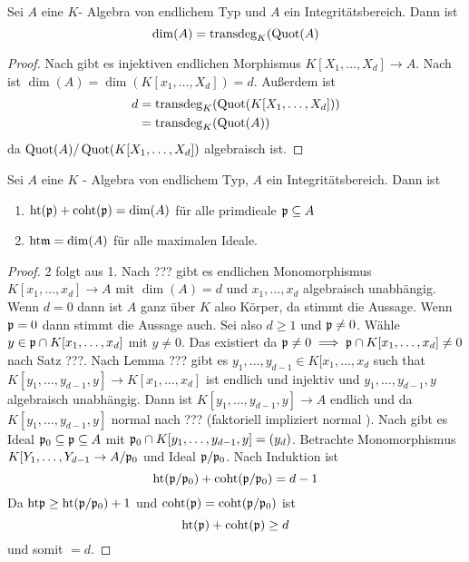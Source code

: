 \begin{Satz} Sei \( A \) eine \( K \)- Algebra von endlichem Typ und \( A \) ein Integritätsbereich. Dann ist 
	\[ \dim(A)=\operatorname{transdeg}_K(\operatorname{Quot}(A) \]
	
\end{Satz}
\begin{proof}
	Nach  gibt es injektiven endlichen Morphismus \( K[X_1,\dots,X_d] \to A\). Nach 
	ist \( \dim(A) = \dim(  K[x_1,\dots,X_d] ) = d \).
	Außerdem ist
	\begin{align*}
		d & = \operatorname{transdeg}_K(\operatorname{Quot}(K[X_1,\dots,X_d]))\\
		&= \operatorname{transdeg}_K(\operatorname{Quot}(A))
	\end{align*} da \( \operatorname{Quot}(A) / \operatorname{Quot}(K[X_1,\dots,X_d])\) algebraisch ist.
\end{proof}
\begin{Satz} Sei \( A \) eine \( K \) - Algebra von endlichem Typ, \(A \) ein Integritätsbereich.
	Dann ist \begin{enumerate}
		\item \( \mathrm{ht}(\mathfrak{p}) + \mathrm{coht}(\mathfrak{p}) = \dim(A) \) für alle primdieale \(\mathfrak{p}\subseteq A \)
		\item \( \mathrm{ht} \mathfrak{m} = \dim (A) \) für alle maximalen Ideale.
	\end{enumerate}
	
\end{Satz}
\begin{proof}
	2 folgt aus 1.
	Nach ??? gibt es endlichen Monomorphismus \( K[x_1,\dots,x_d] \to A \) mit \( \dim(A)=d\) und \( x_1,\dots,x_d\) algebraisch
	unabhängig.
	Wenn \( d=0 \) dann ist \(A\) ganz über \( K \) also Körper, da stimmt die Aussage.
	Wenn \( \mathfrak{p} =0 \) dann stimmt die Aussage auch.
	Sei also \(d\geq 1\) und \( \mathfrak{p}\neq 0 \).
	Wähle \( y \in \mathfrak{p} \cap K[x_1,\dots,x_d] \) mit \( y \neq 0 \). Das existiert da
	\(\mathfrak{p}\neq 0 \implies \mathfrak{p} \cap K[x_1,\dots,x_d]\neq 0 \) nach Satz ???. Nach Lemma ???
	gibt es \( y_1, \dots, y_{d-1} \in K[x_1,\dots, x_d\) such that \( K[y_1,\dots,y_{d-1},y] \to K[x_1,\dots,x_d] \) ist
	endlich und injektiv und \( y_1,\dots,y_{d-1},y \) algebraisch unabhängig. Dann ist \(K[y_1,\dots,y_{d-1},y]\to A\) endlich
	und da \(K[y_1,\dots,y_{d-1},y]\) normal nach ??? (faktoriell impliziert normal ). Nach  gibt es Ideal
	\(\mathfrak{p}_0 \subseteq \mathfrak{p} \subseteq A \) mit \(\mathfrak{p}_0 \cap K[y_1,\dots,y_{d-1},y]= (y_d) \).
	Betrachte Monomorphismus \( K[Y_1,\dots,Y_{d-1} \to A/\mathfrak{p}_0 \) und Ideal \(\mathfrak{p}/\mathfrak{p}_0 \).
	Nach Induktion ist \[\mathrm{ht}(\mathfrak{p}/\mathfrak{p}_0)+\mathrm{coht}(\mathfrak{p}/\mathfrak{p}_0)=d-1\]
	Da \( \mathrm{ht} \mathfrak{p} \geq \mathrm{ht} (\mathfrak{p}/\mathfrak{p}_0 )+1 \) und \(\mathrm{coht}(\mathfrak{p})=\mathrm{coht}(\mathfrak{p}/\mathfrak{p}_0)\)
	ist \[ \mathrm{ht}(\mathfrak{p})+\mathrm{coht}(\mathfrak{p})\geq d \] und somit \(=d\). 
\end{proof}
